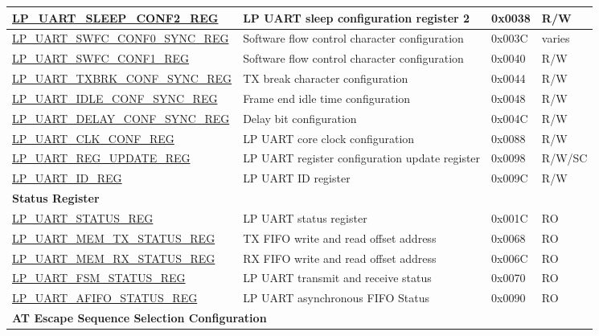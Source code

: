 \begin{longtable}{ | p{6cm} | p{7.2cm} | p{1.3cm} | p{1cm} | }
\hyperref[regdesc:LPUARTSLEEPCONF2REG]{LP\_UART\_SLEEP\_CONF2\_REG} & LP UART sleep configuration register 2 & 0x0038 & R/W \\ \hline
\hyperref[regdesc:LPUARTSWFCCONF0SYNCREG]{LP\_UART\_SWFC\_CONF0\_SYNC\_REG} & Software flow control character configuration & 0x003C & varies \\ \hline
\hyperref[regdesc:LPUARTSWFCCONF1REG]{LP\_UART\_SWFC\_CONF1\_REG} & Software flow control character configuration & 0x0040 & R/W \\ \hline
\hyperref[regdesc:LPUARTTXBRKCONFSYNCREG]{LP\_UART\_TXBRK\_CONF\_SYNC\_REG} & TX break character configuration & 0x0044 & R/W \\ \hline
\hyperref[regdesc:LPUARTIDLECONFSYNCREG]{LP\_UART\_IDLE\_CONF\_SYNC\_REG} & Frame end idle time configuration & 0x0048 & R/W \\ \hline
\hyperref[regdesc:LPUARTDELAYCONFSYNCREG]{LP\_UART\_DELAY\_CONF\_SYNC\_REG} & Delay bit configuration & 0x004C & R/W \\ \hline
\hyperref[regdesc:LPUARTCLKCONFREG]{LP\_UART\_CLK\_CONF\_REG} & LP UART core clock configuration & 0x0088 & R/W \\ \hline
\hyperref[regdesc:LPUARTREGUPDATEREG]{LP\_UART\_REG\_UPDATE\_REG} & LP UART register configuration update register & 0x0098 & R/W/SC \\ \hline
\hyperref[regdesc:LPUARTIDREG]{LP\_UART\_ID\_REG} & LP UART ID register & 0x009C & R/W \\ \hline
\multicolumn{4}{|l|}{\textbf{Status Register}} \\ \hline
\hyperref[regdesc:LPUARTSTATUSREG]{LP\_UART\_STATUS\_REG} & LP UART status register & 0x001C & RO \\ \hline
\hyperref[regdesc:LPUARTMEMTXSTATUSREG]{LP\_UART\_MEM\_TX\_STATUS\_REG} & TX FIFO write and read offset address & 0x0068 & RO \\ \hline
\hyperref[regdesc:LPUARTMEMRXSTATUSREG]{LP\_UART\_MEM\_RX\_STATUS\_REG} & RX FIFO write and read offset address & 0x006C & RO \\ \hline
\hyperref[regdesc:LPUARTFSMSTATUSREG]{LP\_UART\_FSM\_STATUS\_REG} & LP UART transmit and receive status & 0x0070 & RO \\ \hline
\hyperref[regdesc:LPUARTAFIFOSTATUSREG]{LP\_UART\_AFIFO\_STATUS\_REG} & LP UART asynchronous FIFO Status & 0x0090 & RO \\ \hline
\multicolumn{4}{|l|}{\textbf{AT Escape Sequence Selection Configuration}} \\ \hline

\end{longtable}
